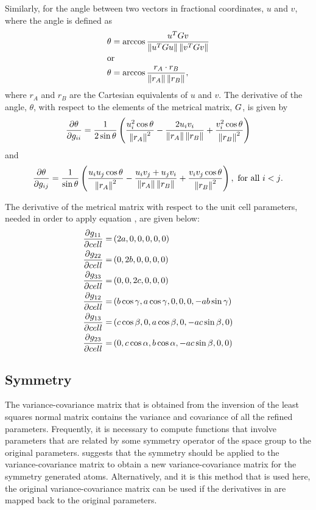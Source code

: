 \documentclass[pdf]{iucr}
\begin{document}
Similarly, for the angle between two vectors in fractional coordinates, $u$ and $v$, where the angle is defined as
\begin{align}
\theta &= \arccos \frac{u^TGv}{\left\| u^TGu \right\|\left\| v^TGv \right\|} \\
\intertext{or}
\theta &= \arccos \frac{r_{A}\cdot r_{B}}{\left\| r_{A} \right\|\left\| r_{B} \right\|}
\label{eqn:angle_cart},
\end{align}
where $r_{A}$ and $r_{B}$ are the Cartesian equivalents of $u$ and $v$. The derivative of the angle, $\theta$, with respect to the elements of the metrical matrix, $G$, is given by
\begin{equation}
\frac{\partial \theta}{\partial g_{ii}} = \frac{1}{2 \sin\theta} \left(\frac{u_i^2 \cos{\theta}}{\left\| r_{A} \right\|^2} - \frac{2 u_i v_i }{\left\| r_{A} \right\|\left\| r_{B} \right\|} +\frac{v_i^2 \cos{\theta}}{\left\| r_{B} \right\|^2}\right)
\label{eqn:d_angle_d_gii}
\end{equation}
and
\begin{equation}
\frac{\partial \theta}{\partial g_{ij}} = \frac{1}{\sin\theta} \left(\frac{u_i u_j \cos{\theta}}{\left\| r_{A} \right\|^2} - \frac{u_i v_j + u_j v_i }{\left\| r_{A} \right\|\left\| r_{B} \right\|} +\frac{v_i v_j \cos{\theta}}{\left\| r_{B} \right\|^2}\right),\ \text{for all $i<j$}.
\label{eqn:d_angle_d_gij}
\end{equation}

The derivative of the metrical matrix with respect to the unit cell parameters, needed in order to apply equation , are given below:
\begin{align}
\frac{\partial g_{11}}{\partial cell} =& \left(2 a,0,0,0,0,0\right) \\ \nonumber
\frac{\partial g_{22}}{\partial cell} =& \left(0,2 b,0,0,0,0\right) \\ \nonumber
\frac{\partial g_{33}}{\partial cell} =& \left(0,0,2 c,0,0,0\right) \\ \nonumber
\frac{\partial g_{12}}{\partial cell} =& \left(b \cos\gamma,a \cos\gamma,0,0,0,-a b \sin\gamma\right) \\ \nonumber
\frac{\partial g_{13}}{\partial cell} =& \left(c \cos\beta,0,a \cos\beta,0,-a c \sin\beta,0\right) \\ \nonumber
\frac{\partial g_{23}}{\partial cell} =& \left(0,c \cos\alpha,b \cos\alpha,-a c \sin\beta,0,0\right) \nonumber
\end{align}

\subsection{Symmetry}
The variance-covariance matrix that is obtained from the inversion of the least squares normal matrix contains the variance and covariance of all the refined parameters. Frequently, it is necessary to compute functions that involve parameters that are related by some symmetry operator of the space group to the original parameters. \cite{Sands:a05356} suggests that the symmetry should be applied to the variance-covariance matrix to obtain a new variance-covariance matrix for the symmetry generated atoms. Alternatively, and it is this method that is used here, the original variance-covariance matrix can be used if the derivatives in  are mapped back to the original parameters.
\end{document}
